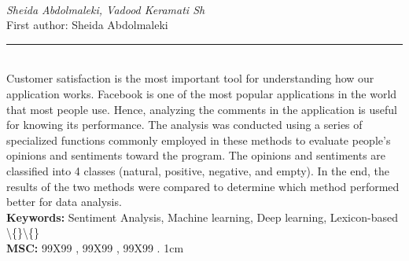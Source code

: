 \documentclass[10pt,twoside]{article}
\begin{document}
\noindent\begin{minipage}[t][\textheight]{\textwidth}
\\[0.35em]
{\itshape Sheida Abdolmaleki, Vadood Keramati Sh}\\[0.2em]
{\footnotesize First author: Sheida Abdolmaleki}\\[0.45em]
\noindent\rule{\textwidth}{0.3pt}\\[0.4em]
{\footnotesize  Customer satisfaction is the most important tool for understanding how our application works. Facebook is one of the most popular applications in the world that most people use. Hence, analyzing the comments in the application is useful for knowing its performance. The analysis was conducted using a series of specialized functions commonly employed in these methods to evaluate people's opinions and sentiments toward the program. The opinions and sentiments are classified into 4 classes (natural, positive, negative, and empty). In the end, the results of the two methods were compared to determine which method performed better for data analysis.}\\[0.4em]
{\footnotesize\bfseries Keywords:} {\footnotesize Sentiment Analysis, Machine learning, Deep learning, Lexicon-based \textbackslash\{\}\textbackslash\{\}}\\[0.15em]
{\footnotesize\bfseries MSC:} {\footnotesize 99X99 , 99X99 , 99X99 . 1cm}\\
\vfill
\end{minipage}
\newpage
\end{document}
